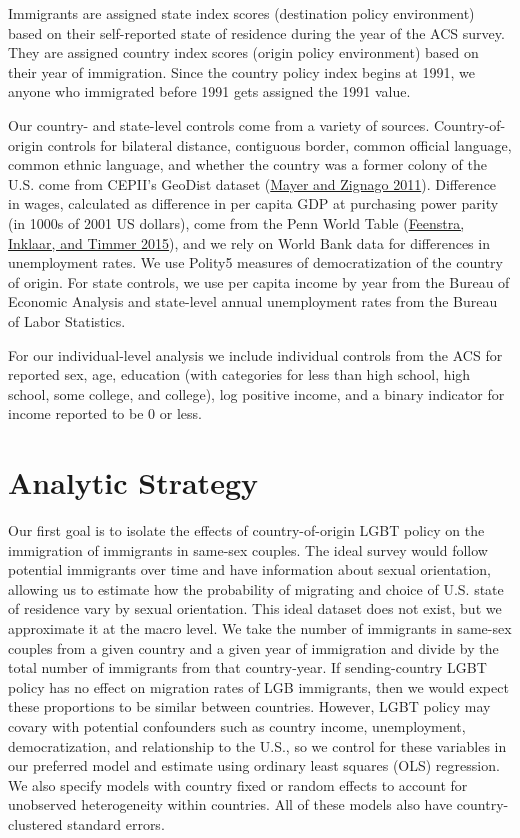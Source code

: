 \documentclass[
  11pt,
]{article}
\begin{document}
Immigrants are assigned state index scores (destination policy environment) based on their self-reported state of residence during the year of the ACS survey. They are assigned country index scores (origin policy environment) based on their year of immigration. Since the country policy index begins at 1991, we anyone who immigrated before 1991 gets assigned the 1991 value.

Our country- and state-level controls come from a variety of sources. Country-of-origin controls for bilateral distance, contiguous border, common official language, common ethnic language, and whether the country was a former colony of the U.S. come from CEPII's GeoDist dataset (\protect\hyperlink{ref-mayer_2011}{Mayer and Zignago 2011}). Difference in wages, calculated as difference in per capita GDP at purchasing power parity (in 1000s of 2001 US dollars), come from the Penn World Table (\protect\hyperlink{ref-feenstra_2015}{Feenstra, Inklaar, and Timmer 2015}), and we rely on World Bank data for differences in unemployment rates. We use Polity5 measures of democratization of the country of origin. For state controls, we use per capita income by year from the Bureau of Economic Analysis and state-level annual unemployment rates from the Bureau of Labor Statistics.

For our individual-level analysis we include individual controls from the ACS for reported sex, age, education (with categories for less than high school, high school, some college, and college), log positive income, and a binary indicator for income reported to be 0 or less.

\hypertarget{analytic-strategy}{%
\section{Analytic Strategy}\label{analytic-strategy}}

Our first goal is to isolate the effects of country-of-origin LGBT policy on the immigration of immigrants in same-sex couples. The ideal survey would follow potential immigrants over time and have information about sexual orientation, allowing us to estimate how the probability of migrating and choice of U.S. state of residence vary by sexual orientation. This ideal dataset does not exist, but we approximate it at the macro level. We take the number of immigrants in same-sex couples from a given country and a given year of immigration and divide by the total number of immigrants from that country-year. If sending-country LGBT policy has no effect on migration rates of LGB immigrants, then we would expect these proportions to be similar between countries. However, LGBT policy may covary with potential confounders such as country income, unemployment, democratization, and relationship to the U.S., so we control for these variables in our preferred model and estimate using ordinary least squares (OLS) regression. We also specify models with country fixed or random effects to account for unobserved heterogeneity within countries. All of these models also have country-clustered standard errors.
\end{document}
